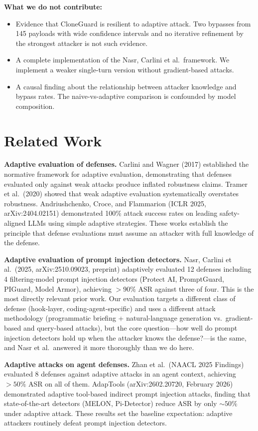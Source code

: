 \documentclass[11pt]{article}
\begin{document}
\noindent\textbf{What we do not contribute:}
\begin{itemize}
  \item Evidence that CloneGuard is resilient to adaptive attack. Two bypasses from 145 payloads with wide confidence intervals and no iterative refinement by the strongest attacker is not such evidence.
  \item A complete implementation of the Nasr, Carlini et al.\ framework. We implement a weaker single-turn version without gradient-based attacks.
  \item A causal finding about the relationship between attacker knowledge and bypass rates. The naive-vs-adaptive comparison is confounded by model composition.
\end{itemize}

\section{Related Work}

\textbf{Adaptive evaluation of defenses.} Carlini and Wagner (2017) established the normative framework for adaptive evaluation, demonstrating that defenses evaluated only against weak attacks produce inflated robustness claims. Tramer et al.\ (2020) showed that weak adaptive evaluation systematically overstates robustness. Andriushchenko, Croce, and Flammarion (ICLR 2025, arXiv:2404.02151) demonstrated 100\% attack success rates on leading safety-aligned LLMs using simple adaptive strategies. These works establish the principle that defense evaluations must assume an attacker with full knowledge of the defense.

\textbf{Adaptive evaluation of prompt injection detectors.} Nasr, Carlini et al.\ (2025, arXiv:2510.09023, preprint) adaptively evaluated 12 defenses including 4 filtering-model prompt injection detectors (Protect AI, PromptGuard, PIGuard, Model Armor), achieving \(>90\%\) ASR against three of four. This is the most directly relevant prior work. Our evaluation targets a different class of defense (hook-layer, coding-agent-specific) and uses a different attack methodology (programmatic briefing + natural-language generation vs.\ gradient-based and query-based attacks), but the core question---how well do prompt injection detectors hold up when the attacker knows the defense?---is the same, and Nasr et al.\ answered it more thoroughly than we do here.

\textbf{Adaptive attacks on agent defenses.} Zhan et al.\ (NAACL 2025 Findings) evaluated 8 defenses against adaptive attacks in an agent context, achieving \(>50\%\) ASR on all of them. AdapTools (arXiv:2602.20720, February 2026) demonstrated adaptive tool-based indirect prompt injection attacks, finding that state-of-the-art detectors (MELON, Pi-Detector) reduce ASR by only \(\sim50\%\) under adaptive attack. These results set the baseline expectation: adaptive attackers routinely defeat prompt injection detectors.
\end{document}
